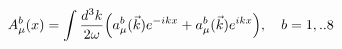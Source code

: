 \begin{equation}
A_\mu^b(x)=\int \frac{d^3k}{2 \omega} \Bigl(a_\mu^b(\vec{k})e^{-ikx}
+a_\mu^b(\vec{k})e^{ikx} \Bigr), \quad b=1,..8
\end{equation}

